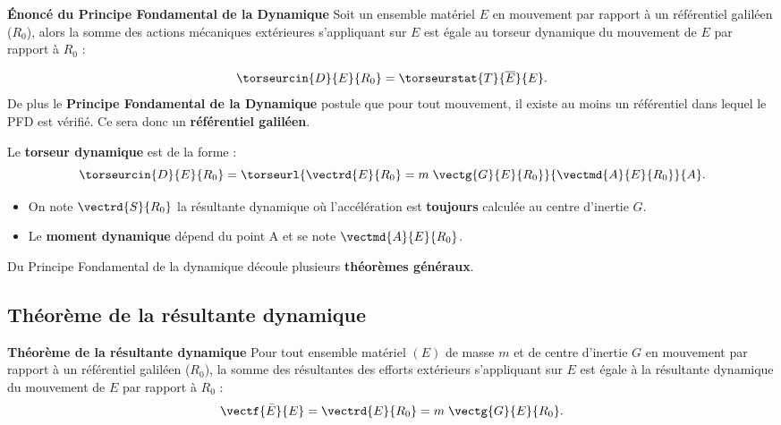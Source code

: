 \begin{definition}\textbf{Énoncé du Principe Fondamental de la Dynamique}
Soit un ensemble matériel $E$ en mouvement par rapport à un référentiel galiléen ($R_0$), alors la somme des actions mécaniques extérieures s'appliquant sur $E$ est égale au torseur dynamique du mouvement de $E$ par rapport à $R_0$ :

$$
\torseurcin{D}{E}{R_0}=\torseurstat{T}{\overline{E}}{E}.
$$
De plus le \textbf{Principe Fondamental de la Dynamique} postule que pour tout mouvement, il existe au moins un référentiel dans lequel le PFD est vérifié. Ce sera donc un \textbf{référentiel galiléen}.


\begin{minipage}[c]{.48\linewidth}
Le \textbf{torseur dynamique} est de la forme : 
$$
\torseurcin{D}{E}{R_0}=\torseurl{
\vectrd{E}{R_0}=m\;\vectg{G}{E}{R_0}
}{
\vectmd{A}{E}{R_0}
}{A}.
$$

\end{minipage} \hfill
\begin{minipage}[c]{.48\linewidth}
\begin{itemize}
\item On note $\vectrd{S}{R_0}$ la résultante dynamique où l'accélération est \textbf{toujours} calculée au centre d'inertie $G$.
\item Le \textbf{moment dynamique} dépend du point A et se note $\vectmd{A}{E}{R_0}$.
\end{itemize}

\end{minipage} 

%



\end{definition}


Du Principe Fondamental de la dynamique découle plusieurs \textbf{théorèmes généraux}.
\subsection{Théorème de la résultante dynamique}

		\begin{theorem}\textbf{Théorème de la résultante dynamique}
			Pour tout ensemble matériel $(E)$ de masse $m$ et de centre d'inertie $G$ en mouvement par rapport à un référentiel galiléen ($R_0$), la somme des résultantes des efforts extérieurs s'appliquant sur $E$ est égale à la résultante dynamique du mouvement de $E$ par rapport à $R_0$ :
$$
\vectf{\bar E}{E}=\vectrd{E}{R_0}=m\;\vectg{G}{E}{R_0}.
$$
	\end{theorem}


